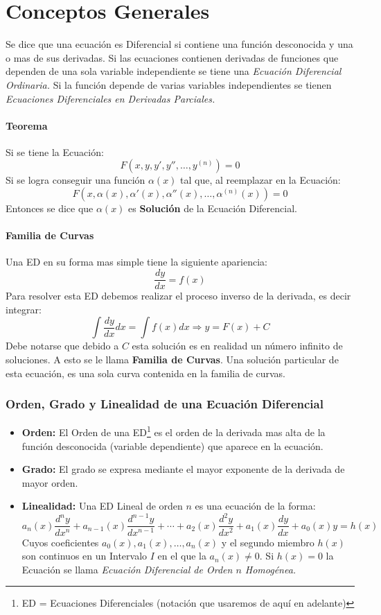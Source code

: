 \chapter{Conceptos Generales}
Se dice que una ecuación es Diferencial si contiene una función desconocida y una o mas de sus derivadas. Si las ecuaciones contienen derivadas de funciones que dependen de una sola variable independiente se tiene una \textit{Ecuación Diferencial Ordinaria.} Si la función depende de varias variables independientes se tienen \textit{Ecuaciones Diferenciales en Derivadas Parciales.}

\subsubsection{Teorema}
Si se tiene la Ecuación:
$$F(x,y,y',y'',\ldots,y^{(n)})=0$$
Si se logra conseguir una función $\alpha(x)$ tal que, al reemplazar en la Ecuación:
$$F(x,\alpha(x),\alpha'(x),\alpha''(x),\ldots,\alpha^{(n)}(x))=0$$
Entonces se dice que $\alpha(x)$ es \textbf{Solución} de la Ecuación Diferencial.
\subsubsection*{Familia de Curvas}
Una ED en su forma mas simple tiene la siguiente apariencia:
$$\dfrac{dy}{dx}=f(x)$$
Para resolver esta ED debemos realizar el proceso inverso de la derivada, es decir integrar:
$$\int\dfrac{dy}{dx}dx=\int f(x) dx\Rightarrow y=F(x)+C$$
Debe notarse que debido a $C$ esta solución es en realidad un número infinito de soluciones. A esto se le llama \textbf{Familia de Curvas}. Una solución particular de esta ecuación, es una sola curva contenida en la familia de curvas.
\subsection*{Orden, Grado y Linealidad de una Ecuación Diferencial}
\begin{itemize}
\item \textbf{Orden:} El Orden de una ED\footnote{ED = Ecuaciones Diferenciales (notación que usaremos de aquí en adelante)} es el orden de la derivada mas alta de la función desconocida (variable dependiente) que aparece en la ecuación.
\item \textbf{Grado:} El grado se expresa mediante el mayor exponente de la derivada de mayor orden.
\item \textbf{Linealidad:} Una ED Lineal de orden $n$ es una ecuación de la forma:
$$a_n(x)\dfrac{d^ny}{dx^n}+a_{n-1}(x)\dfrac{d^{n-1}y}{dx^{n-1}}+\cdots + a_2(x)\dfrac{d^2y}{dx^2}+a_1(x)\dfrac{dy}{dx}+a_0(x)y=h(x)$$
Cuyos coeficientes $a_0(x),a_1(x),\ldots,a_n(x)$ y el segundo miembro $h(x)$ son continuos en un Intervalo $I$ en el que la $a_n(x)\neq 0$. Si $h(x)=0$ la Ecuación se llama \textit{Ecuación Diferencial de Orden $n$ Homogénea.}
\end{itemize}
